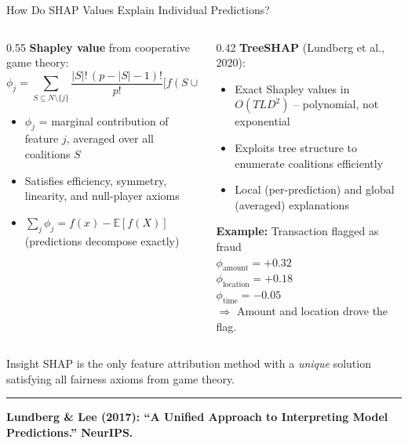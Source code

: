 \documentclass[8pt,aspectratio=169]{beamer}
\newcommand{\bottomnote}[1]{%
\vfill
\vspace{-2mm}
\textcolor{mllavender2}{\rule{\textwidth}{0.4pt}}
\vspace{1mm}
\footnotesize
\textbf{#1}
}
\newenvironment{compactlist}{%
  \begin{itemize}%
    \setlength{\itemsep}{2pt}%
    \setlength{\parskip}{0pt}%
    \setlength{\parsep}{0pt}%
}{%
  \end{itemize}%
}
\begin{document}
\begin{frame}{How Do SHAP Values Explain Individual Predictions?}
\begin{columns}[T]
\begin{column}{0.55\textwidth}
\small
\textbf{Shapley value} from cooperative game theory:
\[
\phi_j = \!\!\sum_{S \subseteq N \setminus \{j\}} \frac{|S|!\,(p-|S|-1)!}{p!}\bigl[f(S \cup \{j\}) - f(S)\bigr]
\]

\vspace{0.3em}
\footnotesize
\begin{compactlist}
\item $\phi_j$ = marginal contribution of feature $j$, averaged over all coalitions $S$
\item Satisfies efficiency, symmetry, linearity, and null-player axioms
\item $\sum_j \phi_j = f(x) - \mathbb{E}[f(X)]$ (predictions decompose exactly)
\end{compactlist}
\end{column}
\begin{column}{0.42\textwidth}
\footnotesize
\textbf{TreeSHAP} (Lundberg et al., 2020):
\begin{compactlist}
\item Exact Shapley values in $O(TLD^2)$ -- polynomial, not exponential
\item Exploits tree structure to enumerate coalitions efficiently
\item Local (per-prediction) and global (averaged) explanations
\end{compactlist}

\vspace{0.5em}
\scriptsize
\textbf{Example:} Transaction flagged as fraud\\
$\phi_{\text{amount}} = +0.32$\\
$\phi_{\text{location}} = +0.18$\\
$\phi_{\text{time}} = -0.05$\\
$\Rightarrow$ Amount and location drove the flag.
\end{column}
\end{columns}

\begin{block}{Insight}
\scriptsize SHAP is the only feature attribution method with a \emph{unique} solution satisfying all fairness axioms from game theory.
\end{block}
\bottomnote{Lundberg \& Lee (2017): ``A Unified Approach to Interpreting Model Predictions.'' NeurIPS.}
\end{frame}
\end{document}
